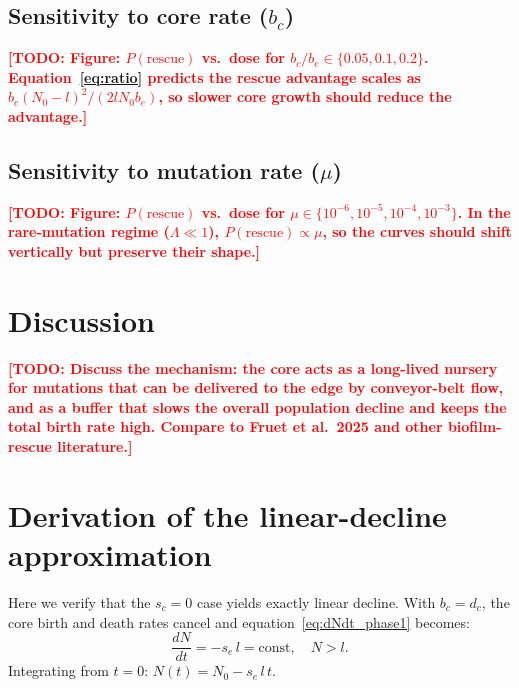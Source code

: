 \documentclass[12pt]{article}
\newcommand{\Nzero}{N_0}
\newcommand{\sEdge}{s_e}
\newcommand{\sCore}{s_c}
\newcommand{\bEdge}{b_e}
\newcommand{\bCore}{b_c}
\newcommand{\dCore}{d_c}
\newcommand{\TODO}[1]{\textcolor{red}{\textbf{[TODO: #1]}}}
\begin{document}
\subsection{Sensitivity to core rate ($\bCore$)}
\label{sec:core_sensitivity}

\TODO{Figure: $P(\text{rescue})$ vs.\ dose for $\bCore / \bEdge \in
\{0.05, 0.1, 0.2\}$. Equation~\eqref{eq:ratio} predicts the rescue advantage
scales as $\bCore (\Nzero - l)^2 / (2 l \Nzero \bEdge)$, so slower core
growth should reduce the advantage.}

\subsection{Sensitivity to mutation rate ($\mu$)}
\label{sec:mu_sensitivity}

\TODO{Figure: $P(\text{rescue})$ vs.\ dose for $\mu \in \{10^{-6},
10^{-5}, 10^{-4}, 10^{-3}\}$. In the rare-mutation regime
($\Lambda \ll 1$), $P(\text{rescue}) \propto \mu$, so the curves
should shift vertically but preserve their shape.}

\section{Discussion}
\label{sec:discussion}

\TODO{Discuss the mechanism: the core acts as a long-lived nursery for
mutations that can be delivered to the edge by conveyor-belt flow, and
as a buffer that slows the overall population decline and keeps the
total birth rate high. Compare to Fruet et al.\ 2025 and other
biofilm-rescue literature.}

\appendix
\section{Derivation of the linear-decline approximation}
\label{app:linear}

Here we verify that the $\sCore = 0$ case yields exactly linear decline.
With $\bCore = \dCore$, the core birth and death rates cancel and
equation~\eqref{eq:dNdt_phase1} becomes:
\begin{equation}
    \frac{dN}{dt} = -\sEdge\, l = \text{const}, \quad N > l.
\end{equation}
Integrating from $t = 0$: $N(t) = \Nzero - \sEdge\, l\, t$.
\end{document}
